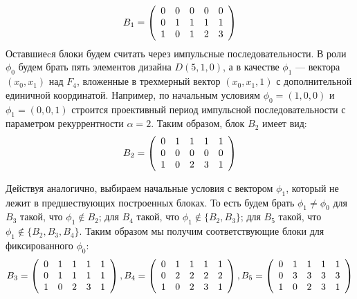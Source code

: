 \documentclass[12pt]{article}
\begin{document}
$$B_1 = 
\left( {\begin{array}{*{20}c}
   0 & 0 & 0 & 0 & 0  \\
   0 & 1 & 1 & 1 & 1\\
   1 & 0 & 1 & 2 & 3
 \end{array} } \right)
$$
Оставшиеcя блоки будем считать через импульсные последовательности. В роли $\phi_0$ будем брать пять элементов дизайна $D(5, 1, 0)$, а в качестве $\phi_1$ — вектора $(x_0, x_1)$ над $F_4$, вложенные в трехмерный вектор $(x_0, x_1, 1)$ с дополнительной единичной координатой. Например, по начальным условиям $\phi_0 = (1, 0, 0)$ и $\phi_1 = (0, 0, 1)$ строится проективный период импульсной последовательности с параметром рекуррентности $\alpha = 2$. Таким образом, блок $B_2$ имеет вид:
$$B_2 = 
\left( {\begin{array}{*{20}c}
   0 & 1 & 1 & 1 & 1\\
   0 & 0 & 0 & 0 & 0\\
   1 & 0 & 2 & 3 & 1
 \end{array} } \right)
$$

Действуя аналогично, выбираем начальные условия с вектором $\phi_1$, который не лежит в предшествующих построенных блоках. То есть будем брать $\phi_1 \neq \phi_0$ для $B_3$ такой, что $\phi_1 \notin B_2$; для $B_4$ такой, что $\phi_1 \notin \{B_2,B_3\}$; для $B_5$ такой, что $\phi_1 \notin \{B_2,B_3,B_4\}$. Таким образом мы получим соответствующие блоки для фиксированного $\phi_0$:
$$B_3 = 
\left( {\begin{array}{*{20}c}
   0 & 1 & 1 & 1 & 1\\
   0 & 1 & 1 & 1 & 1\\
   1 & 0 & 2 & 3 & 1
 \end{array} } \right), 
B_4 = 
\left( {\begin{array}{*{20}c}
   0 & 1 & 1 & 1 & 1\\
   0 & 2 & 2 & 2 & 2\\
   1 & 0 & 2 & 3 & 1
 \end{array} } \right), 
B_5 = 
\left( {\begin{array}{*{20}c}
   0 & 1 & 1 & 1 & 1\\
   0 & 3 & 3 & 3 & 3\\
   1 & 0 & 2 & 3 & 1
 \end{array} } \right)
$$
\end{document}
